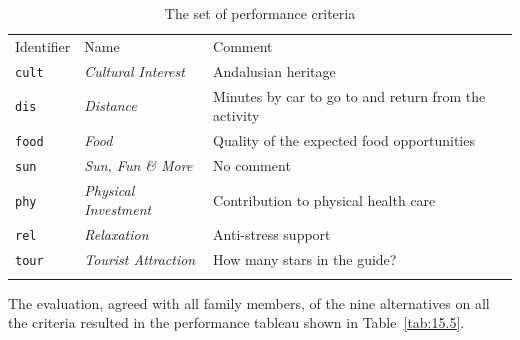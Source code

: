 \begin{table}[ht]
\caption{The set of performance criteria}
\label{tab:15.4}       %
\begin{center}
\begin{small}
    \begin{tabular}{l l l}
      \svhline\noalign{\smallskip}
      Identifier & Name & Comment \\
      \noalign{\smallskip}\hline\noalign{\smallskip}
      \texttt{cult}   & \emph{Cultural Interest}  & Andalusian heritage\\
      \texttt{dis}  & \emph{Distance}  & Minutes by car to go to and return from the activity\\
      \texttt{food}  & \emph{Food}  &  Quality of the expected food opportunities\\
      \texttt{sun} & \emph{Sun, Fun \& More}  &  No comment\\
      \texttt{phy}   & \emph{Physical Investment}  &  Contribution to physical health care\\
      \texttt{rel}  & \emph{Relaxation}   &  Anti-stress support\\
      \texttt{tour}  & \emph{Tourist Attraction}   &  How many stars in the guide? \\
      \noalign{\smallskip}\hline
    \end{tabular}
\end{small}
\end{center}
\end{table}

The evaluation, agreed with all family members, of the nine alternatives on all the criteria resulted in the performance tableau shown in Table~\vref{tab:15.5}.

